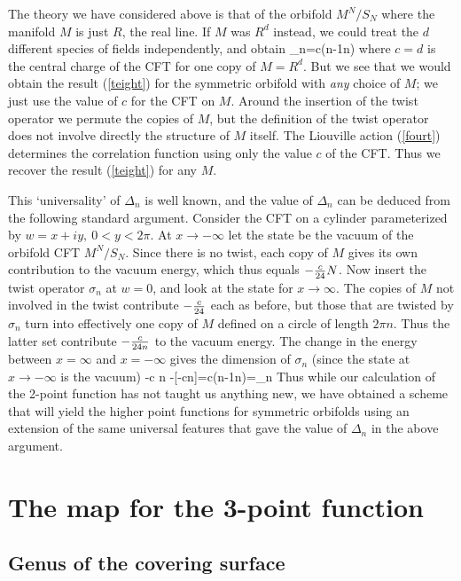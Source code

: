 \documentclass[12pt]{article}
\begin{document}
The theory we  have considered above is that of the orbifold
$M^N/S_N$ where the manifold $M$ is just $R$, the real line.
If $M$ was $R^d$ instead,  we could treat the $d$ different species
of fields independently, and obtain
\be
\Delta_n={c}(n-{1\over n})
\label{teight}
\ee
where $c=d$ is the central charge of the CFT for one copy of $M=R^d$.
But we see that we would obtain the result
(\ref{teight}) for the symmetric orbifold with {\it any} choice of
$M$; we just use the value of $c$ for the CFT on $M$.
Around the insertion of the twist operator we permute the copies of
$M$, but the definition of the twist operator does not
involve directly the structure of $M$ itself.  The Liouville action
(\ref{fourt}) determines the correlation function using only
the value $c$ of the CFT. Thus we recover the result (\ref{teight})
for any $M$.

This `universality' of $\Delta_n$ is well known, and the value of
$\Delta_n$ can be deduced from the following  standard argument.
   Consider the CFT on a cylinder parameterized by
$w=x+iy, ~0<y<2\pi$. At $x\rightarrow -\infty$ let the state
be the vacuum of the orbifold CFT $M^N/S_N$. Since there is no twist,
   each copy of $M$ gives its own contribution
to the vacuum energy, which thus equals $-{c\over 24}N$.  Now insert
the twist operator $\sigma_n$ at $w=0$, and look at
the state for $x\rightarrow\infty$. The copies of $M$ not involved in
the twist contribute $-{c\over 24}$ each as before, but
those that are twisted by $\sigma_n$ turn into  effectively one copy
of $M$ defined on a circle of length $2\pi n$. Thus the
latter set contribute $-{c\over 24 n}$ to the vacuum energy. The
change in the energy between $x = \infty$ and
$x=-\infty$ gives the dimension of $\sigma_n$ (since the state at
$x\rightarrow -\infty$ is the vacuum)
\be
-{c n} -[-{cn}]={c}(n-{1\over n})=\Delta_n
\ee
Thus while our calculation of the 2-point function has not taught us
anything new,  we have obtained a scheme that will
yield the higher point functions for symmetric orbifolds using an
extension of the same universal features that gave the
value of $\Delta_n$ in the above argument.

\section{The map for the 3-point function}
\renewcommand{\theequation}{4.\arabic{equation}}
\setcounter{equation}{0}
\subsection{Genus of the covering surface}
\end{document}

